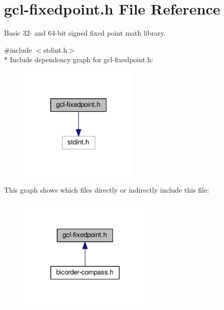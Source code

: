 \hypertarget{gcl-fixedpoint_8h}{}\section{gcl-\/fixedpoint.h File Reference}
\label{gcl-fixedpoint_8h}


Basic 32-\/ and 64-\/bit signed fixed point math library.  


{\ttfamily \#include $<$stdint.\+h$>$}\\*
Include dependency graph for gcl-\/fixedpoint.h\+:
\nopagebreak
\begin{figure}[H]
\begin{center}
\leavevmode
\includegraphics[width=163pt]{gcl-fixedpoint_8h__incl}
\end{center}
\end{figure}
This graph shows which files directly or indirectly include this file\+:
\nopagebreak
\begin{figure}[H]
\begin{center}
\leavevmode
\includegraphics[width=182pt]{gcl-fixedpoint_8h__dep__incl}
\end{center}
\end{figure}
